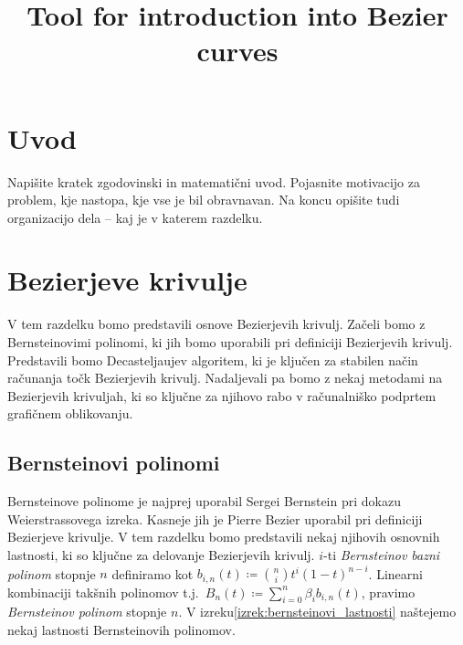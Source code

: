 \documentclass[isrm2, tisk]{fmfdelo}
\title{Tool for introduction into Bezier curves}
\newcommand{\bernstein}[2]{\binom{#1}{#2}t^{#2}(1-t)^{#1-#2}}
\newcommand{\lilb}[2]{b_{#1,#2}(t)}
\newcommand{\bigb}[1]{B_{#1}(t)}
\newcommand{\bernsteinsum}[2]{\sum_{#1=0}^{#2} \beta_{#1}\lilb{#1}{#2}}
\newcommand{\bsum}{\bernsteinsum{i}{n}}
\begin{document}
    \section{Uvod}
    Napišite kratek zgodovinski in matematični uvod. Pojasnite motivacijo za problem, kje
    nastopa, kje vse je bil obravnavan. Na koncu opišite tudi organizacijo dela -- kaj je v
    katerem razdelku.


    \section{Bezierjeve krivulje}\label{sec:bezierjeve-krivulje}
    V tem razdelku bomo predstavili osnove Bezierjevih krivulj.
    Začeli bomo z Bernsteinovimi polinomi, ki jih bomo uporabili pri definiciji Bezierjevih krivulj.
    Predstavili bomo Decasteljaujev algoritem, ki je ključen za stabilen način računanja točk Bezierjevih krivulj.
    Nadaljevali pa bomo z nekaj metodami na Bezierjevih krivuljah, ki so ključne za njihovo rabo v računalniško podprtem grafičnem oblikovanju.

    \subsection{Bernsteinovi polinomi}\label{subsec:bernsteinovi-polinomi}
    Bernsteinove polinome je najprej uporabil Sergei Bernstein pri dokazu Weierstrassovega izreka.
    Kasneje jih je Pierre Bezier uporabil pri definiciji Bezierjeve krivulje.
    V tem razdelku bomo predstavili nekaj njihovih osnovnih lastnosti, ki so ključne za delovanje Bezierjevih krivulj.
    $i$-ti \textit{Bernsteinov bazni polinom} stopnje $n$ definiramo kot $\lilb{i}{n} \coloneqq\bernstein{n}{i}$.
    Linearni kombinaciji takšnih polinomov t.j.\ $\bigb{n} \coloneqq \bsum$, pravimo \textit{Bernsteinov polinom} stopnje $n$.
    V izreku\ref{izrek:bernsteinovi_lastnosti} naštejemo nekaj lastnosti Bernsteinovih polinomov.
\end{document}
